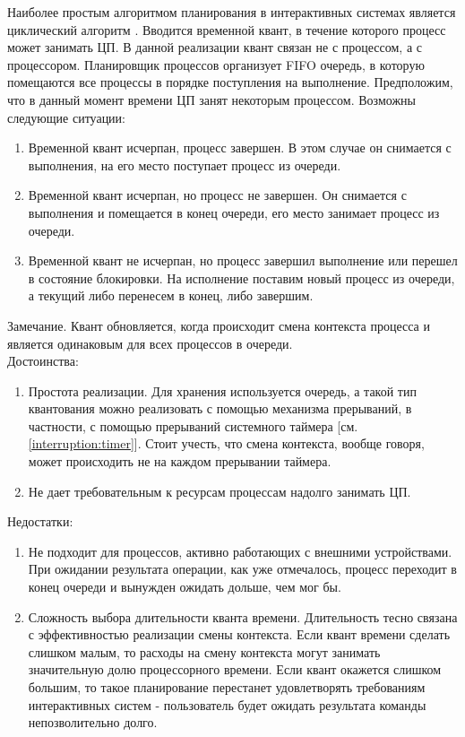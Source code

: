 \label{int:cyclical}
Наиболее простым алгоритмом планирования в интерактивных системах является циклический алгоритм \cite{tanenbaum} \cite{ubuntuman} . Вводится временной квант, в течение которого процесс может занимать ЦП. В данной реализации квант связан не с процессом, а с процессором. Планировщик процессов организует FIFO очередь, в которую помещаются все процессы в порядке поступления на выполнение. Предположим, что в данный момент времени ЦП занят некоторым процессом. Возможны следующие ситуации:
\begin{enumerate}[label=---]
\item Временной квант исчерпан, процесс завершен. В этом случае он снимается с выполнения, на его место поступает процесс из очереди.
\item Временной квант исчерпан, но процесс не завершен. Он снимается с выполнения и помещается в конец очереди, его место занимает процесс из очереди.
\item Временной квант не исчерпан, но процесс завершил выполнение или перешел в состояние блокировки. На исполнение поставим новый процесс из очереди, а текущий либо перенесем в конец, либо завершим.
\end{enumerate}
Замечание. Квант обновляется, когда происходит смена контекста процесса и является одинаковым для всех процессов в очереди.\\

Достоинства:
\begin{enumerate}[label=---]
\item Простота реализации. Для хранения используется очередь, а такой тип квантования можно реализовать с помощью механизма прерываний, в частности, с помощью прерываний системного таймера [см. \ref{interruption:timer}]. Стоит учесть, что смена контекста, вообще говоря, может происходить не на каждом прерывании таймера.
\item Не дает требовательным к ресурсам процессам надолго занимать ЦП.
\end{enumerate}

Недостатки:
\begin{enumerate}[label=---]
\item Не подходит для процессов, активно работающих с внешними устройствами. При ожидании результата операции, как уже отмечалось, процесс переходит в конец очереди и вынужден ожидать дольше, чем мог бы.
\item Сложность выбора длительности кванта времени. Длительность тесно связана с эффективностью реализации смены контекста. Если квант времени сделать слишком малым, то расходы на смену контекста могут занимать значительную долю процессорного времени. Если квант окажется слишком большим, то такое планирование перестанет удовлетворять требованиям интерактивных систем - пользователь будет ожидать результата команды непозволительно долго.
\end{enumerate}

